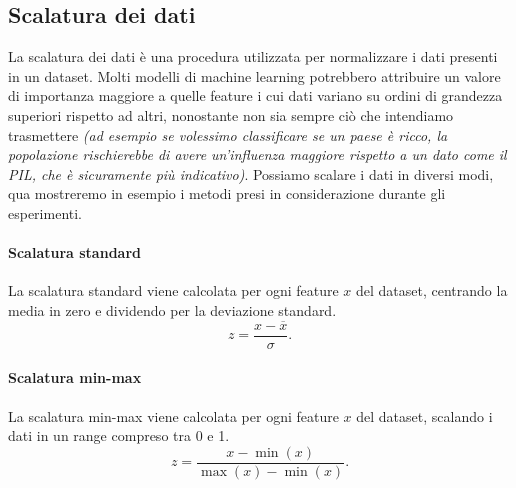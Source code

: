 \documentclass[12pt, twoside, letterpaper]{report}
\begin{document}
			\subsection{Scalatura dei dati} La scalatura dei dati è una procedura utilizzata per normalizzare i dati presenti in un dataset. Molti modelli di machine learning potrebbero attribuire un valore di importanza maggiore a quelle feature i cui dati variano su ordini di grandezza superiori rispetto ad altri, nonostante non sia sempre ciò che intendiamo trasmettere \textit{(ad esempio se volessimo classificare se un paese è ricco, la popolazione rischierebbe di avere un'influenza maggiore rispetto a un dato come il PIL, che è sicuramente più indicativo)}. Possiamo scalare i dati in diversi modi, qua mostreremo in esempio i metodi presi in considerazione durante gli esperimenti.
			
				\paragraph{Scalatura standard} La scalatura standard viene calcolata per ogni feature $x$ del dataset, centrando la media in zero e dividendo per la deviazione standard. $$z = \frac{x - \overline{x}}{\sigma}.$$
				
				\paragraph{Scalatura min-max} La scalatura min-max viene calcolata per ogni feature $x$ del dataset, scalando i dati in un range compreso tra 0 e 1. $$z = \frac{x - \min(x)}{\max(x) - \min(x)}.$$
			
\end{document}
